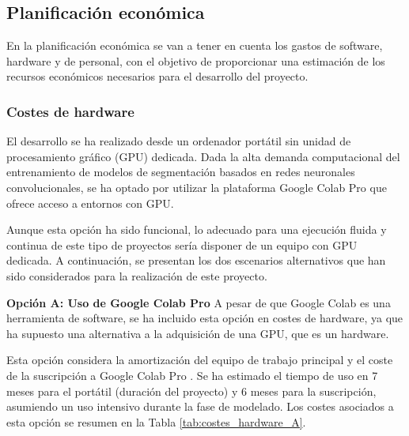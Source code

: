     
\subsection{Planificación económica}
En la planificación económica se van a tener en cuenta los gastos de software, hardware y de personal, con el objetivo de proporcionar una estimación de los recursos económicos necesarios para el desarrollo del proyecto.

\subsubsection{Costes de hardware}
El desarrollo se ha realizado desde un ordenador portátil sin unidad de procesamiento gráfico (GPU) dedicada. Dada la alta demanda computacional del entrenamiento de modelos de segmentación basados en redes neuronales convolucionales, se ha optado por utilizar la plataforma Google Colab Pro que ofrece acceso a entornos con GPU.

Aunque esta opción ha sido funcional, lo adecuado para una ejecución fluida y continua de este tipo de proyectos sería disponer de un equipo con GPU dedicada. A continuación, se presentan los dos escenarios alternativos que han sido considerados para la realización de este proyecto.

\textbf{Opción A: Uso de Google Colab Pro}
A pesar de que Google Colab es una herramienta de software, se ha incluido esta opción en costes de hardware, ya que ha supuesto una alternativa a la adquisición de una GPU, que es un hardware.

Esta opción considera la amortización del equipo de trabajo principal y el coste de la suscripción a Google Colab Pro \cite{googlecolabpro_ref}. Se ha estimado el tiempo de uso en 7 meses para el portátil (duración del proyecto) y 6 meses para la suscripción, asumiendo un uso intensivo durante la fase de modelado. Los costes asociados a esta opción se resumen en la Tabla \ref{tab:costes_hardware_A}.

